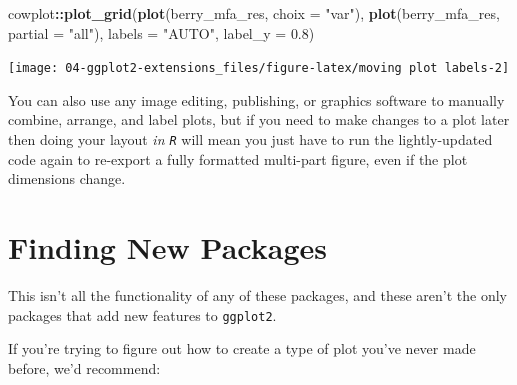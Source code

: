 \documentclass[
]{book}
\newenvironment{Shaded}{\begin{snugshade}}{\end{snugshade}}
\newcommand{\AttributeTok}[1]{\textcolor[rgb]{0.13,0.29,0.53}{#1}}
\newcommand{\FloatTok}[1]{\textcolor[rgb]{0.00,0.00,0.81}{#1}}
\newcommand{\FunctionTok}[1]{\textcolor[rgb]{0.13,0.29,0.53}{\textbf{#1}}}
\newcommand{\NormalTok}[1]{#1}
\newcommand{\SpecialCharTok}[1]{\textcolor[rgb]{0.81,0.36,0.00}{\textbf{#1}}}
\newcommand{\StringTok}[1]{\textcolor[rgb]{0.31,0.60,0.02}{#1}}
\begin{document}
\begin{Shaded}
\begin{Highlighting}[]
\NormalTok{cowplot}\SpecialCharTok{::}\FunctionTok{plot\_grid}\NormalTok{(}\FunctionTok{plot}\NormalTok{(berry\_mfa\_res, }\AttributeTok{choix =} \StringTok{"var"}\NormalTok{),}
                   \FunctionTok{plot}\NormalTok{(berry\_mfa\_res, }\AttributeTok{partial =} \StringTok{"all"}\NormalTok{),}
                   \AttributeTok{labels =} \StringTok{"AUTO"}\NormalTok{,}
                   \AttributeTok{label\_y =} \FloatTok{0.8}\NormalTok{)}
\end{Highlighting}
\end{Shaded}

\begin{center}\texttt{[image: 04-ggplot2-extensions\_files/figure-latex/moving plot labels-2]} \end{center}

You can also use any image editing, publishing, or graphics software to manually combine, arrange, and label plots, but if you need to make changes to a plot later then doing your layout \emph{in \texttt{R}} will mean you just have to run the lightly-updated code again to re-export a fully formatted multi-part figure, even if the plot dimensions change.

\hypertarget{finding-new-packages}{%
\section{Finding New Packages}\label{finding-new-packages}}

This isn't all the functionality of any of these packages, and these aren't the only packages that add new features to \texttt{ggplot2}.

If you're trying to figure out how to create a type of plot you've never made before, we'd recommend:
\end{document}
